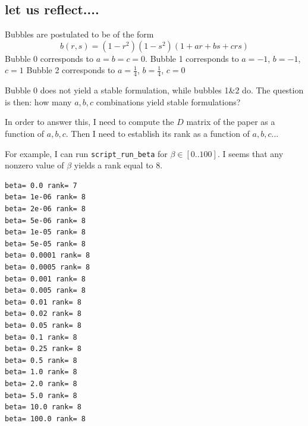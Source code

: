 \subsection*{let us reflect....}

Bubbles are postulated to be of the form
\[
b(r,s) = (1-r^2)(1-s^2) (1 + ar + bs + crs  )
\]
Bubble 0 corresponds to $a=b=c=0$. 
Bubble 1 corresponds to $a=-1$, $b=-1$, $c=1$
Bubble 2 corresponds to $a=\frac14$, $b=\frac14$, $c=0$

Bubble 0 does not yield a stable formulation, while bubbles 1\&2 do. 
The question is then: how many $a,b,c$ combinations yield stable formulations?

In order to answer this, I need to compute the $D$ matrix of the paper
as a function of $a,b,c$. Then I need to establish its rank as a function of $a,b,c$...

For example, I can run {\tt script\_run\_beta} for $\beta\in [0..100]$. 
I seems that any nonzero value of $\beta$ yields a rank equal to 8.
\begin{verbatim}
beta= 0.0 rank= 7
beta= 1e-06 rank= 8
beta= 2e-06 rank= 8
beta= 5e-06 rank= 8
beta= 1e-05 rank= 8
beta= 5e-05 rank= 8
beta= 0.0001 rank= 8
beta= 0.0005 rank= 8
beta= 0.001 rank= 8
beta= 0.005 rank= 8
beta= 0.01 rank= 8
beta= 0.02 rank= 8
beta= 0.05 rank= 8
beta= 0.1 rank= 8
beta= 0.25 rank= 8
beta= 0.5 rank= 8
beta= 1.0 rank= 8
beta= 2.0 rank= 8
beta= 5.0 rank= 8
beta= 10.0 rank= 8
beta= 100.0 rank= 8
\end{verbatim}


